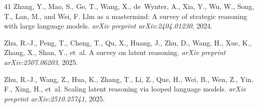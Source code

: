 \begin{thebibliography}{41}
Zhang, Y., Mao, S., Ge, T., Wang, X., de~Wynter, A., Xia, Y., Wu, W., Song, T.,
  Lan, M., and Wei, F.
\newblock Llm as a mastermind: A survey of strategic reasoning with large
  language models.
\newblock \textit{arXiv preprint arXiv:2404.01230}, 2024.

Zhu, R.-J., Peng, T., Cheng, T., Qu, X., Huang, J., Zhu, D., Wang, H., Xue, K.,
  Zhang, X., Shan, Y., et~al.
\newblock A survey on latent reasoning.
\newblock \textit{arXiv preprint arXiv:2507.06203}, 2025{}.

Zhu, R.-J., Wang, Z., Hua, K., Zhang, T., Li, Z., Que, H., Wei, B., Wen, Z.,
  Yin, F., Xing, H., et~al.
\newblock Scaling latent reasoning via looped language models.
\newblock \textit{arXiv preprint arXiv:2510.25741}, 2025{}.

\end{thebibliography}
